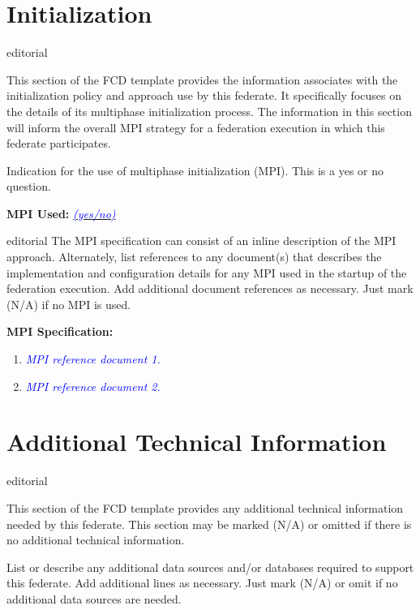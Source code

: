 \documentclass[11pt,english,letterpaper]{article}
\newcommand{\example}[1]{{\textcolor{blue}{\textit{#1}}}}
\begin{document}
\section*{Initialization}

\begin{shownto}{editorial}
{\color{red} This section of the FCD template provides the information
associates with the initialization policy and approach use by this federate. It
specifically focuses on the details of its multiphase initialization process.
The information in this section will inform the overall MPI strategy for a
federation execution in which this federate participates.

Indication for the use of multiphase initialization (MPI). This is a yes or no
question.}
\end{shownto}

\textbf{MPI Used: } \underline{\example{(yes/no)}}

\begin{shownto}{editorial}
{\color{red} The MPI specification can consist of an inline description of the
MPI approach. Alternately, list references to any document(s) that describes the
implementation and configuration details for any MPI used in the startup of the
federation execution. Add additional document references as necessary. Just mark
(N/A) if no MPI is used.}
\end{shownto}

\textbf{MPI Specification: }
\begin{enumerate}
\item \example{MPI reference document 1.}
\item \example{MPI reference document 2.}
\end{enumerate}


\section*{Additional Technical Information}

\begin{shownto}{editorial}
{\color{red} This section of the FCD template provides any additional technical
information needed by this federate. This section may be marked (N/A) or omitted
if there is no additional technical information.

List or describe any additional data sources and/or databases required to
support this federate. Add additional lines as necessary. Just mark (N/A) or
omit if no additional data sources are needed.}
\end{shownto}
\end{document}
